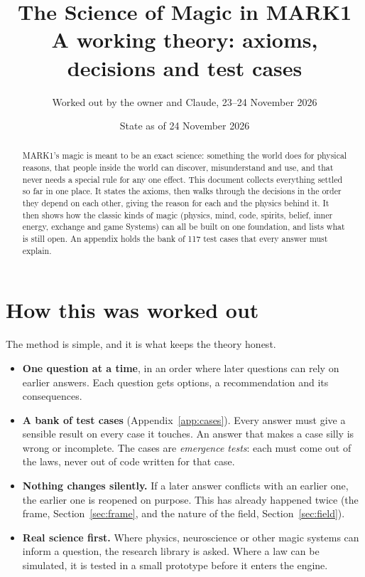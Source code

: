 \documentclass[11pt,a4paper]{article}
\title{The Science of Magic in MARK1\\[4pt]\large A working theory: axioms, decisions and test cases}
\author{Worked out by the owner and Claude, 23--24 November 2026}
\date{State as of 24 November 2026}
\begin{document}
\maketitle

\begin{abstract}
\noindent MARK1's magic is meant to be an exact science: something the world does for physical reasons, that people inside the world can discover, misunderstand and use, and that never needs a special rule for any one effect. This document collects everything settled so far in one place. It states the axioms, then walks through the decisions in the order they depend on each other, giving the reason for each and the physics behind it. It then shows how the classic kinds of magic (physics, mind, code, spirits, belief, inner energy, exchange and game Systems) can all be built on one foundation, and lists what is still open. An appendix holds the bank of 117 test cases that every answer must explain.
\end{abstract}

\tableofcontents
\newpage

\section{How this was worked out}

The method is simple, and it is what keeps the theory honest.
\begin{itemize}
  \item \textbf{One question at a time}, in an order where later questions can rely on earlier answers. Each question gets options, a recommendation and its consequences.
  \item \textbf{A bank of test cases} (Appendix~\ref{app:cases}). Every answer must give a sensible result on every case it touches. An answer that makes a case silly is wrong or incomplete. The cases are \emph{emergence tests}: each must come out of the laws, never out of code written for that case.
  \item \textbf{Nothing changes silently.} If a later answer conflicts with an earlier one, the earlier one is reopened on purpose. This has already happened twice (the frame, Section~\ref{sec:frame}, and the nature of the field, Section~\ref{sec:field}).
  \item \textbf{Real science first.} Where physics, neuroscience or other magic systems can inform a question, the research library is asked. Where a law can be simulated, it is tested in a small prototype before it enters the engine.
\end{itemize}
\end{document}
